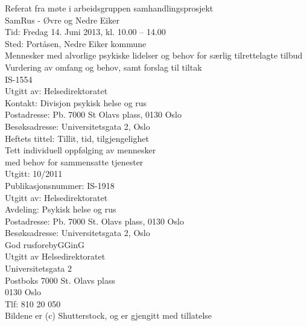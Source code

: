 \documentclass[11pt]{report} %
\begin{document}
\begin{thebibliography}{99}
                  Referat fra møte i arbeidsgruppen samhandlingsprosjekt\\ 
                  SamRus - Øvre og Nedre Eiker\\
                  Tid: Fredag 14. Juni 2013,  kl. 10.00 – 14.00\\
                  Sted: Portåsen, Nedre Eiker kommune\\

                  Mennesker med alvorlige psykiske lidelser og behov for særlig tilrettelagte tilbud Vurdering av omfang og behov, samt forslag til tiltak\\
                  IS-1554\\
                  Utgitt av: Helsedirektoratet\\
                  Kontakt: Divisjon psykisk helse og rus\\
                  Postadresse: Pb. 7000 St Olavs plass, 0130 Oslo\\
                  Besøksadresse: Universitetsgata 2, Oslo\\

                  Heftets tittel: Tillit, tid, tilgjengelighet\\
                  Tett individuell oppfølging av mennesker\\
                  med behov for sammensatte tjenester\\
                  Utgitt: 10/2011\\
                  Publikasjonsnummer: IS-1918\\
                  Utgitt av: Helsedirektoratet\\
                  Avdeling: Psykisk helse og rus\\
                  Postadresse: Pb. 7000 St. Olavs plass, 0130 Oslo\\
                  Besøksadresse: Universitetsgata 2, Oslo\\

                  God rusforebyGGinG\\
                  Utgitt av Helsedirektoratet\\
                  Universitetsgata 2\\
                  Postboks 7000 St. Olavs plass\\
                  0130 Oslo\\
                  Tlf: 810 20 050\\

                  Bildene er (c) Shutterstock, og er gjengitt med tillatelse\\
  




              \end{thebibliography}
\end{document}
